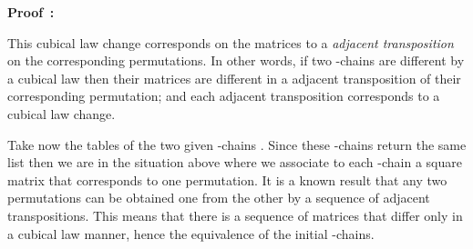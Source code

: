 \documentclass[submission,copyright,creativecommons]{eptcs}
\newenvironment{proof}[1][\!\!\,]{\vspace{1ex}\noindent\textbf{Proof #1: }}{\hfill\vspace{2ex}}
\begin{document}
\begin{proof}
\begin{figure}[tp]
\caption{}
\label{fig_ex_matrix}
\end{figure}



This cubical law change corresponds on the matrices to a \textit{adjacent transposition} on the corresponding permutations. In other words, if two -chains are different by a cubical law then their matrices are different in a adjacent transposition of their corresponding permutation; and each adjacent transposition corresponds to a cubical law change.

Take now the tables of the two given -chains . Since these -chains return the same list then we are in the situation above where we associate to each -chain a square matrix that corresponds to one permutation. It is a known result that any two permutations can be obtained one from the other by a sequence of adjacent transpositions. This means that there is a sequence of matrices that differ only in a cubical law manner, hence the equivalence of the initial -chains.
\end{proof}
\end{document}
